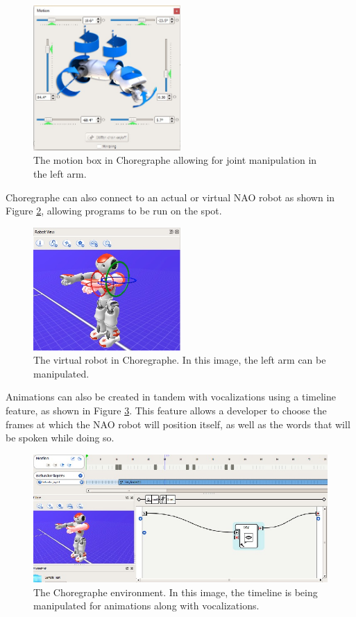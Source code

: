 \documentclass[onecolumn, draftclsnofoot,10pt, compsoc]{IEEEtran}
\begin{document}
\begin{figure}[H]
	\centering
	\includegraphics[width=0.5\textwidth]{choregraphe-movement}
	\caption{The motion box in Choregraphe allowing for joint manipulation in the left arm.}
	\label{fig:choregraphe-movement}
\end{figure}

Choregraphe can also connect to an actual or virtual NAO robot as shown in Figure \ref{fig:choregraphe-robot}, allowing programs to be run on the spot.

\begin{figure}[H]
	\centering
	\includegraphics[width=0.5\textwidth]{choregraphe-robot}
	\caption{The virtual robot in Choregraphe. In this image, the left arm can be manipulated.}
	\label{fig:choregraphe-robot}
\end{figure}

Animations can also be created in tandem with vocalizations using a timeline feature, as shown in Figure \ref{fig:choregraphe-timeline}. This feature allows a developer to choose the frames at which the NAO robot will position itself, as well as the words that will be spoken while doing so.

\begin{figure}[H]
	\centering
	\includegraphics{choregraphe-timeline}
	\caption{The Choregraphe environment. In this image, the timeline is being manipulated for animations along with vocalizations.}
	\label{fig:choregraphe-timeline}
\end{figure}
\end{document}
